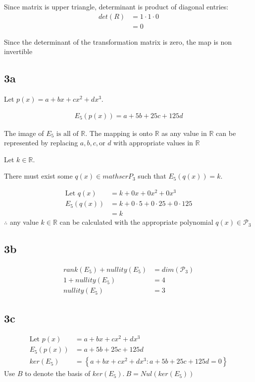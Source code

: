 \documentclass{article}
\begin{document}
Since matrix is upper triangle, determinant is product of diagonal entries:
\begin{align*}
     det(R) &= 1\cdot1\cdot0\\
     &= 0
\end{align*}

Since the determinant of the transformation matrix is zero, the map is non invertible
\newpage
\subsection*{3a}
Let $p(x) = a + bx + cx^2 + dx^3$.

\begin{align*}
    E_5\left(p\left(x\right)\right) = a+5b+25c+125d
\end{align*}

The image of $E_5 \text{ is all of } \mathbb{R}$. The mapping is onto $\mathbb{R}$ as any value in $\mathbb{R}$ can be represented by replacing $a, b, c,\text{or }d$ with appropriate values in $\mathbb{R}$

Let $k \in \mathbb{R}$.

There must exist some $q(x) \in mathscr{P}_3$ such that $E_5(q(x)) = k$.

\begin{align*}
\text{Let } q(x) &= k + 0x + 0x^2 + 0x^3\\
E_5(q(x)) &= k + 0\cdot5 + 0\cdot25 + 0\cdot125\\
&= k
\end{align*}
$\therefore$ any value $k \in \mathbb{R}$ can be calculated with the appropriate polynomial $q(x) \in \mathscr{P}_3$
\subsection*{3b}
\begin{align*}
    rank(E_5) + nullity(E_5) &= dim(\mathscr{P}_3)\\
    1 + nullity(E_5) &= 4\\
    nullity(E_5) &= 3
\end{align*}
\subsection*{3c}
\begin{align*}
    \text{Let } p(x) &= a+bx+cx^2+dx^3\\
    E_5(p(x)) &= a+5b+25c+125d\\
    ker(E_5) &= \left\{a+bx+cx^2+dx^3: a+5b+25c+125d = 0\right\}
\end{align*}
Use $B$ to denote the basis of $ker(E_5).~B = Nul(ker(E_5))$
\end{document}
